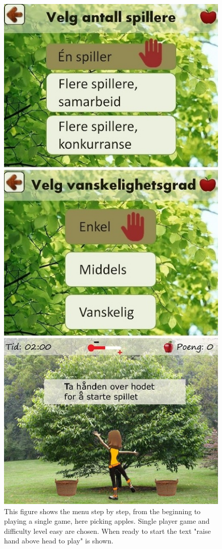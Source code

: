 \begin{figure} [H]
\centering
\includegraphics[scale=0.45]{menuStep2.jpg}
\caption[Menu review - part two]{This figure shows the menu step by step, from the beginning to playing a single game, here picking apples. Single player game and difficulty level easy are chosen. When ready to start the text "raise hand above head to play" is shown.}
\label{menu2}
\end{figure}
